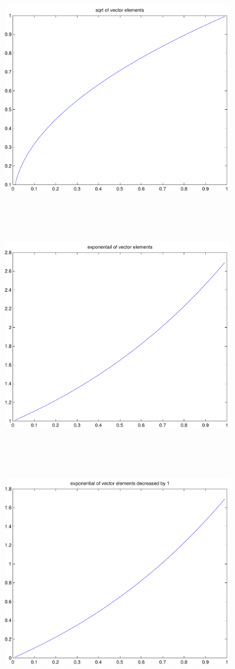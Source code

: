 \documentclass[9pt]{article}
\theoremstyle{plain}
\theoremstyle{definition}
\theoremstyle{remark}
\numberwithin{equation}{section}
\begin{document}
\includegraphics[width=10.0cm,height=10.0cm]{klVSLSqrt.pdf}

\includegraphics[width=10.0cm,height=10.0cm]{klVSLExp.pdf}

\includegraphics[width=10.0cm,height=10.0cm]{klVSLExpm1.pdf}
\end{document}
